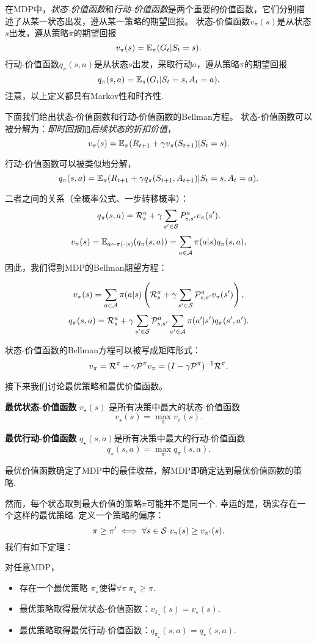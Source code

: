在MDP中，\emph{状态-价值函数}和\emph{行动-价值函数}是两个重要的价值函数，它们分别描述了从某一状态出发，遵从某一策略的期望回报。
状态-价值函数$v_\pi(s)$是从状态$s$出发，遵从策略$\pi$的期望回报
    \[v_\pi(s) = \E_\pi(G_t|S_t=s).\]
行动-价值函数$q_\pi(s,a)$是从状态$s$出发，采取行动$a$，遵从策略$\pi$的期望回报
    \[q_\pi(s,a) = \E_\pi(G_t|S_t=s,A_t=a).\]
注意，以上定义都具有Markov性和时齐性.

下面我们给出状态-价值函数和行动-价值函数的Bellman方程。
状态-价值函数可以被分解为：\emph{即时回报}加\emph{后续状态的折扣价值}，
\[v_\pi(s) = \E_\pi(R_{t+1} + \gamma v_\pi(S_{t+1})|S_t=s).\]

行动-价值函数可以被类似地分解，
\[q_\pi(s,a) = \E_\pi(R_{t+1} + \gamma q_\pi(S_{t+1},A_{t+1})|S_t=s,A_t=a).\]

二者之间的关系（全概率公式、一步转移概率）：
\[q_\pi(s,a) =\mathcal R_s^a + \gamma \sum_{s'\in \MS}P_{s,s'}^a v_\pi(s').\]
\[v_\pi(s) = \E_{a\sim\pi(\cdot|s)}(q_\pi(s,a))=\sum_{a\in\mathcal A}\pi(a|s)q_\pi(s,a),\]
因此，我们得到MDP的Bellman期望方程：

\begin{proposition}
\[v_\pi(s) = \sum_{a\in \mathcal A}\pi(a|s)\left(\mathcal R_s^a + \gamma \sum_{s'\in \MS}\P_{s,s'}^av_\pi(s')\right),\]
\[q_\pi(s,a) = \mathcal R_s^a + \gamma \sum_{s'\in \MS}\P_{s,s'}^a \sum_{a'\in \mathcal A}\pi(a'|s')q_\pi(s',a').\]
\end{proposition}

状态-价值函数的Bellman方程可以被写成矩阵形式：
\[v_\pi = \mathcal R^\pi + \gamma \P^\pi v_\pi = (I-\gamma \mathcal P^\pi)^{-1}\mathcal R^\pi.\]

接下来我们讨论最优策略和最优价值函数。

\begin{definition}
\textbf{最优状态-价值函数} $v_\star(s)$ 是所有决策中最大的状态-价值函数
    \[v_\star(s) = \max_\pi v_\pi(s).\]

\textbf{最优行动-价值函数} $q_\star(s,a)$是所有决策中最大的行动-价值函数
    \[q_\star(s,a) = \max_\pi q_\pi(s,a).\]
\end{definition}
最优价值函数确定了MDP中的最佳收益，解MDP即确定达到最优价值函数的策略. 

然而，每个状态取到最大价值的策略$\pi$可能并不是同一个. 幸运的是，确实存在一个这样的最优策略. 定义一个策略的偏序：
    \[\pi\ge\pi' \iff \forall s\in\MS\ v_\pi(s) \ge v_{\pi'}(s).\]
我们有如下定理：
\begin{theorem}[MDP解的存在性]
对任意MDP，
\begin{itemize}
    \item 存在一个最优策略 $\pi_\star$使得$\forall \pi\ \pi_\star\ge\pi$.
    \item 最优策略取得最优状态-价值函数：$v_{\pi_\star}(s) = v_\star(s)$.
    \item 最优策略取得最优行动-价值函数：$q_{\pi_\star}(s,a)=q_\star(s,a)$.
\end{itemize}
\end{theorem}

